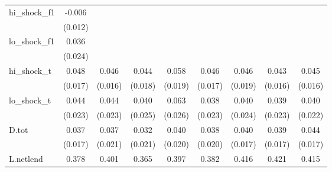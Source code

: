 {\begin{tabular}{l*{8}{c}}
\addlinespace
hi\_shock\_f1 &      -0.006         &                     &                     &                     &                     &                     &                     &                     \\
            &     (0.012)         &                     &                     &                     &                     &                     &                     &                     \\
\addlinespace
lo\_shock\_f1 &       0.036         &                     &                     &                     &                     &                     &                     &                     \\
            &     (0.024)         &                     &                     &                     &                     &                     &                     &                     \\
\addlinespace
hi\_shock\_t  &       0.048\sym{***}&       0.046\sym{***}&       0.044\sym{**} &       0.058\sym{***}&       0.046\sym{**} &       0.046\sym{**} &       0.043\sym{**} &       0.045\sym{**} \\
            &     (0.017)         &     (0.016)         &     (0.018)         &     (0.019)         &     (0.017)         &     (0.019)         &     (0.016)         &     (0.016)         \\
\addlinespace
lo\_shock\_t  &       0.044\sym{*}  &       0.044\sym{*}  &       0.040         &       0.063\sym{**} &       0.038         &       0.040         &       0.039         &       0.040\sym{*}  \\
            &     (0.023)         &     (0.023)         &     (0.025)         &     (0.026)         &     (0.023)         &     (0.024)         &     (0.023)         &     (0.022)         \\
\addlinespace
D.tot       &       0.037\sym{**} &       0.037\sym{*}  &       0.032         &       0.040\sym{*}  &       0.038\sym{*}  &       0.040\sym{**} &       0.039\sym{**} &       0.044\sym{**} \\
            &     (0.017)         &     (0.021)         &     (0.021)         &     (0.020)         &     (0.020)         &     (0.017)         &     (0.017)         &     (0.017)         \\
\addlinespace
L.netlend   &       0.378\sym{***}&       0.401\sym{***}&       0.365\sym{***}&       0.397\sym{***}&       0.382\sym{***}&       0.416\sym{***}&       0.421\sym{***}&       0.415\sym{***}\\

\end{tabular}}
